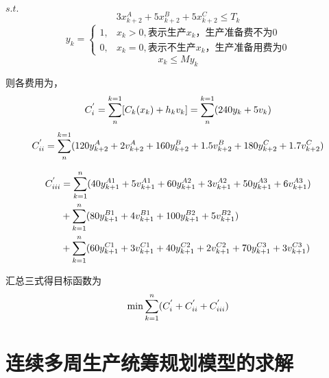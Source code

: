 $s.t.$
\begin{equation}
    3x_{k+2}^A+5x_{k+2}^B+5x_{k+2}^C \leq T_k
\end{equation}
\begin{equation}
    y_k=\begin{cases}
        1, & x_k > 0, \text{表示生产}x_k，\text{生产准备费不为}0 \\
        0, & x_k = 0, \text{表示不生产}x_k，\text{生产准备用费为}0 
    \end{cases}
\end{equation}
\begin{equation}
    x_k \leq My_k
\end{equation}

则各费用为，
\begin{equation}
    C_{\uppercase\expandafter{\romannumeral1}}^{'}=
        \sum_{n}^{k=1}[C_k(x_k)+h_k{v_k}]=
        \sum_{n}^{k=1}(240y_k+5v_k)
\end{equation}
\begin{equation}
    C_{\uppercase\expandafter{\romannumeral2}}^{'}=
        \sum_{n}^{k=1}(120y_{k+2}^A+2v_{k+2}^A+160y_{k+2}^B+1.5v_{k+2}^B+180y_{k+2}^C+1.7v_{k+2}^C)
\end{equation}

\begin{equation}
    \begin{aligned}
        C_{\uppercase\expandafter{\romannumeral3}}^{'} &= 
            \sum_{k=1}^{n}(40y_{k+1}^{A1}+5v_{k+1}^{A1}+60y_{k+1}^{A2}+3v_{k+1}^{A2}+50y_{k+1}^{A3}+6v_{k+1}^{A3}) \\
            &+ \sum_{k=1}^{n}(80y_{k+1}^{B1}+4v_{k+1}^{B1}+100y_{k+1}^{B2}+5v_{k+1}^{B2}) \\
            &+ \sum_{k=1}^{n}(60y_{k+1}^{C1}+3v_{k+1}^{C1}+40y_{k+1}^{C2}+2v_{k+1}^{C2}+70y_{k+1}^{C3}+3v_{k+1}^{C3})
    \end{aligned}
\end{equation}



汇总三式得目标函数为
\begin{equation}
    \min\sum_{k=1}^{n}(
            C_{\uppercase\expandafter{\romannumeral1}}^{'}+
            C_{\uppercase\expandafter{\romannumeral2}}^{'}+
            C_{\uppercase\expandafter{\romannumeral3}}^{'}) 
\end{equation}

\section{连续多周生产统筹规划模型的求解}

